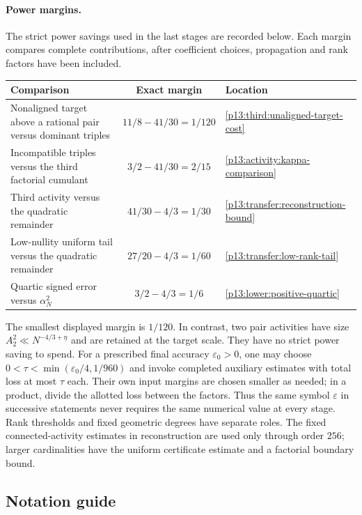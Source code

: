 \paragraph{Power margins.}
The strict power savings used in the last stages are recorded below.
Each margin compares complete contributions, after coefficient choices,
propagation and rank factors have been included.
\begin{center}
\small
\begin{tabularx}{\textwidth}{@{}Xcl@{}}
\toprule
Comparison & Exact margin & Location\\
\midrule
Nonaligned target above a rational pair versus dominant triples
& $11/8-41/30=1/120$
& \eqref{p13:third:unaligned-target-cost}\\[4pt]
Incompatible triples versus the third factorial cumulant
& $3/2-41/30=2/15$
& \eqref{p13:activity:kappa-comparison}\\[4pt]
Third activity versus the quadratic remainder
& $41/30-4/3=1/30$
& \eqref{p13:transfer:reconstruction-bound}\\[4pt]
Low-nullity uniform tail versus the quadratic remainder
& $27/20-4/3=1/60$
& \eqref{p13:transfer:low-rank-tail}\\[4pt]
Quartic signed error versus $\alpha_N^2$
& $3/2-4/3=1/6$
& \eqref{p13:lower:positive-quartic}\\
\bottomrule
\end{tabularx}
\end{center}
The smallest displayed margin is $1/120$. In contrast, two pair
activities have size $A_2^2\ll N^{-4/3+\eta}$ and are retained at
the target scale. They have no strict power saving to spend.
For a prescribed final accuracy $\varepsilon_0>0$, one may choose
$0<\tau<\min(\varepsilon_0/4,1/960)$ and invoke completed auxiliary
estimates with total loss at most $\tau$ each. Their own input margins
are chosen smaller as needed; in a product, divide the allotted loss
between the factors. Thus the same symbol $\varepsilon$ in successive
statements never requires the same numerical value at every stage.
Rank thresholds and fixed geometric degrees have separate roles.
The fixed connected-activity estimates in reconstruction are used only
through order $256$; larger cardinalities have the uniform certificate estimate and a factorial
boundary bound.

\subsection{Notation guide}
\label{p1:intro:notation}

